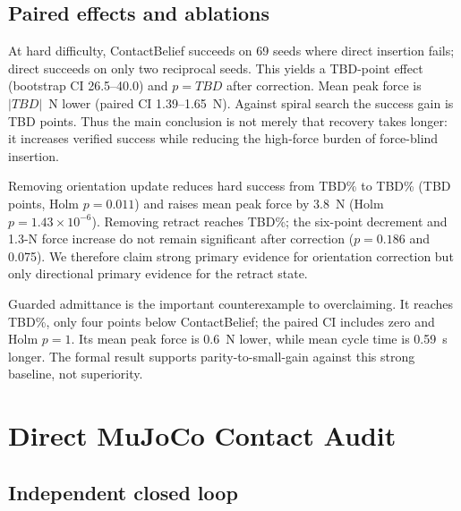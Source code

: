 \documentclass[journal]{IEEEtran}
\newcommand{\HardOursSuccess}{TBD}
\newcommand{\HardGuardedSuccess}{TBD}
\newcommand{\HardNoOrientSuccess}{TBD}
\newcommand{\HardNoRetractSuccess}{TBD}
\newcommand{\HardDeltaDirect}{TBD}
\newcommand{\HardDeltaSpiral}{TBD}
\newcommand{\HardDeltaNoOrient}{TBD}
\newcommand{\HardDirectHolm}{TBD}
\newcommand{\HardDirectForceDelta}{TBD}
\begin{document}
\subsection{Paired effects and ablations}

\begin{table}[t]
  \centering
  \caption{Hard-condition paired comparisons, ContactBelief minus comparator.
  Negative $\Delta$force favors ContactBelief.  Holm correction covers 21 tests
  per endpoint family.}
  \label{tab:paired}
  \resizebox{\columnwidth}{!}{%
    }
\end{table}

At hard difficulty, ContactBelief succeeds on 69 seeds where direct insertion
fails; direct succeeds on only two reciprocal seeds.  This yields a
\HardDeltaDirect-point effect (bootstrap CI 26.5--40.0) and
$p=\HardDirectHolm$ after correction.  Mean peak force is
$|\HardDirectForceDelta|$~N lower (paired CI 1.39--1.65~N).  Against spiral
search the success gain is \HardDeltaSpiral{} points.  Thus the main conclusion
is not merely that recovery takes longer: it increases verified success while
reducing the high-force burden of force-blind insertion.

Removing orientation update reduces hard success from \HardOursSuccess\% to
\HardNoOrientSuccess\% (\HardDeltaNoOrient{} points, Holm $p=0.011$) and raises
mean peak force by 3.8~N (Holm $p=1.43\times10^{-6}$).  Removing retract reaches
\HardNoRetractSuccess\%; the six-point decrement and 1.3-N force increase do not
remain significant after correction ($p=0.186$ and 0.075).  We therefore claim
strong primary evidence for orientation correction but only directional primary
evidence for the retract state.

Guarded admittance is the important counterexample to overclaiming.  It reaches
\HardGuardedSuccess\%, only four points below ContactBelief; the paired CI
includes zero and Holm $p=1$.  Its mean peak force is 0.6~N lower, while mean
cycle time is 0.59~s longer.  The formal result supports parity-to-small-gain
against this strong baseline, not superiority.

\section{Direct MuJoCo Contact Audit}

\subsection{Independent closed loop}
\end{document}
